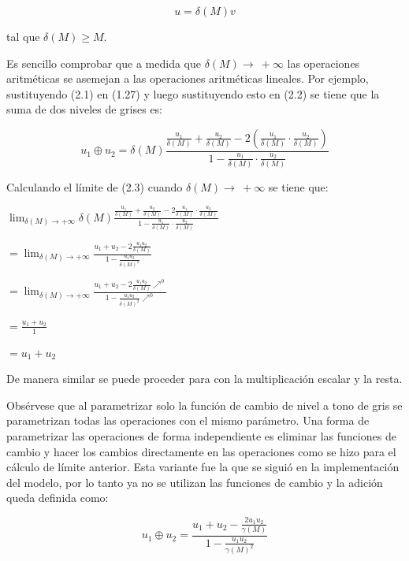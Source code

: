 \begin{equation}
	u=\delta(M)v
\end{equation}

tal que $\delta(M) \geq M$.

Es sencillo comprobar que a medida que $\delta(M)\to\ +\infty$ las operaciones aritm\'eticas se asemejan a las operaciones aritm\'eticas lineales. Por ejemplo, sustituyendo (2.1) en (1.27) y luego sustituyendo esto en (2.2) se tiene que la suma de dos niveles de grises es:

\begin{equation}
	u_1\oplus u_2=\delta(M)\frac{\frac{u_1}{\delta(M)}+\frac{u_2}{\delta(M)}-2\left(\frac{u_1}{\delta(M)}\cdot\frac{u_2}{\delta(M)}\right)}{1-\frac{u_1}{\delta(M)}\cdot\frac{u_2}{\delta(M)}}
\end{equation}

Calculando el l\'imite de (2.3) cuando $\delta(M)\to\ +\infty$ se tiene que:

\begin{center}
	$\displaystyle\lim_{\delta(M) \to +\infty}\delta(M)\frac{\frac{u_1}{\delta(M)}+\frac{u_2}{\delta(M)}-2\frac{u_1}{\delta(M)}\cdot\frac{u_2}{\delta(M)}}{1-\frac{u_1}{\delta(M)}\cdot\frac{u_2}{\delta(M)}}$
	
	$\displaystyle=\lim_{\delta(M) \to +\infty}\frac{u_1+u_2-2\frac{u_1u_2}{\delta(M)}}{1-\frac{u_1u_2}{\delta(M)^2}}$
	
	$\displaystyle=\lim_{\delta(M) \to +\infty}\frac{u_1+u_2-2\frac{u_1u_2}{\delta(M)}\nearrow^0}{1-\frac{u_1u_2}{\delta(M)^2}\nearrow^0}$
	
	$\displaystyle=\frac{u_1+u_2}{1}$
	
	$\displaystyle=u_1+u_2$
\end{center}

De manera similar se puede proceder para con la multiplicaci\'on escalar y la resta.

Obs\'ervese que al parametrizar solo la funci\'on de cambio de nivel a tono de gris se parametrizan todas las operaciones con el mismo par\'ametro. Una forma de parametrizar las operaciones de forma independiente es eliminar las funciones de cambio y hacer los cambios directamente en las operaciones como se hizo para el c\'alculo de l\'imite anterior. Esta variante fue la que se sigui\'o en la implementaci\'on del modelo, por lo tanto ya no se utilizan las funciones de cambio y la adici\'on queda definida como:

\begin{equation}
	u_1\oplus u_2=\frac{u_1+u_2-\frac{2u_1u_2}{\gamma(M)}}{1-\frac{u_1u_2}{\gamma(M)^2}}
\end{equation}

